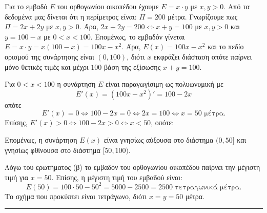 \begin{center}
\end{center}
\begin{alist}
\item Για το εμβαδό $E$ του ορθογωνίου οικοπέδου έχουμε $E = x \cdot y$ με $x, y > 0$. Από τα δεδομένα μας δίνεται ότι η περίμετρος είναι: $\Pi = 200$ μέτρα. Γνωρίζουμε πως $\Pi = 2x + 2y$ με $x, y > 0$. Άρα, $2x + 2y = 200 \Leftrightarrow x + y = 100$ με $x, y > 0$ και $y = 100 - x$ με $0 < x < 100$. Επομένως, το εμβαδόν γίνεται $E = x \cdot y = x(100 - x) = 100x - x^2$. Άρα, $E(x) = 100x - x^2$ και το πεδίο ορισμού της συνάρτησης είναι $(0,100)$, διότι $x$ εκφράζει διάσταση οπότε παίρνει μόνο θετικές τιμές και μέχρι $100$ βάση της εξίσωσης $x + y = 100$.
\item Για $0 < x < 100$ η συνάρτηση $E$ είναι παραγωγίσιμη ως πολυωνυμική με
\[ E'(x) = (100x - x^2)' = 100 - 2x \]
οπότε
\[ E'(x) = 0 \Leftrightarrow 100 - 2x = 0 \Leftrightarrow 2x = 100 \Leftrightarrow x = 50 \text{ μέτρα.} \]
Επίσης, $E'(x) > 0 \Leftrightarrow 100 - 2x > 0 \Leftrightarrow x < 50$, οπότε:

\begin{center}
\end{center}

Επομένως, η συνάρτηση $E(x)$ είναι γνησίως αύξουσα στο διάστημα $(0,50]$ και γνησίως φθίνουσα στο διάστημα $[50,100)$.

\item Λόγω του ερωτήματος (β) το εμβαδόν του ορθογωνίου οικοπέδου παίρνει την μέγιστη τιμή για $x = 50$. Επίσης, η μέγιστη τιμή του εμβαδού είναι:
\[ E(50) = 100 \cdot 50 - 50^2 = 5000 - 2500 = 2500 \text{ τετραγωνικά μέτρα.} \]
Το σχήμα που προκύπτει είναι τετράγωνο, διότι $x = y = 50$ μέτρα.
\end{alist}
\vspace{6mm}
\noindent\rule{\textwidth}{0.4pt}
\vspace{6mm}

